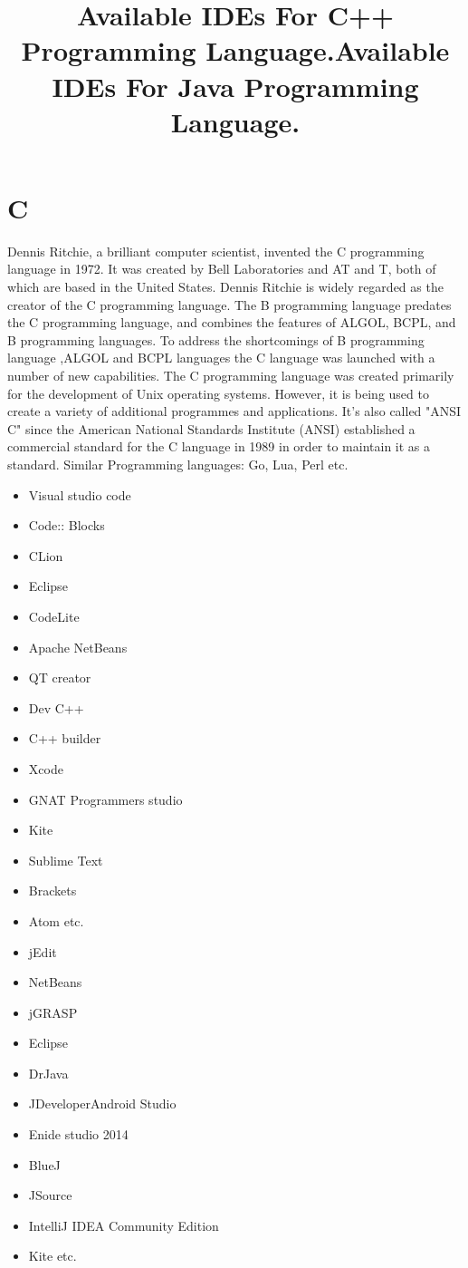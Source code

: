 \documentclass{article}
\begin{document}
    \section*{C}
    Dennis Ritchie, a brilliant computer scientist, invented the C programming             language in 1972. It was created by Bell Laboratories and AT and T, both of which are based in the United States. 
    Dennis Ritchie is widely regarded as the creator of the C programming                   language. 
    The B programming language predates the C programming language, and combines the features of ALGOL, BCPL, and B programming languages.
    To address the shortcomings of B programming language ,ALGOL and BCPL             languages the C  language was launched with a number of      new capabilities. 
    The C programming language was created primarily for the development of        Unix operating systems. 
    However, it is being used to create a variety of additional programmes and          applications.
    It's also called "ANSI C" since the American National Standards Institute (ANSI) established a commercial standard for the C language in 1989 in order to maintain it as a standard.
    Similar Programming languages: Go, Lua, Perl etc.
    \title*{Available IDEs For C++ Programming Language.}
    \begin{itemize}
    \item Visual studio code
    \item Code:: Blocks
    \item CLion
    \item Eclipse 
    \item CodeLite
    \item Apache NetBeans
    \item QT creator
    \item Dev C++
    \item C++ builder
    \item Xcode
    \item GNAT Programmers studio
    \item Kite 
    \item Sublime Text
    \item Brackets
    \item Atom etc.
     \end{itemize}
    \title*{Available IDEs For Java Programming Language.}
    \begin{itemize}
    	\item jEdit
    	\item NetBeans
    	\item jGRASP
    	\item Eclipse 
    	\item DrJava
    	\item JDeveloperAndroid Studio
    	\item Enide studio 2014
    	\item BlueJ
    	\item JSource
    	\item IntelliJ IDEA Community Edition
    	\item Kite etc.
    	\end{itemize}
\end{document}
